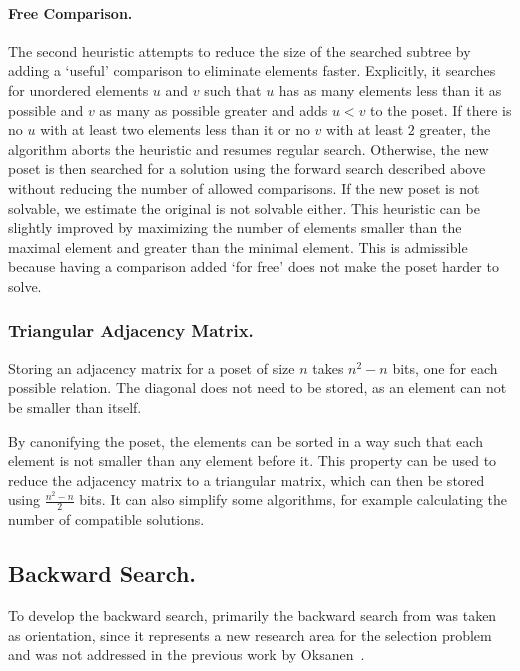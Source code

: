 \documentclass[twoside,leqno,twocolumn]{article}
\begin{document}
\paragraph{Free Comparison.}
The second heuristic attempts to reduce the size of the searched subtree by adding a `useful' comparison to eliminate elements faster.
Explicitly, it searches for unordered elements $u$ and $v$ such that $u$ has as many elements less than it as possible and $v$ as many as possible greater and adds $u < v$ to the poset.
If there is no $u$ with at least two elements less than it or no $v$ with at least $2$ greater, the algorithm aborts the heuristic and resumes regular search.
Otherwise, the new poset is then searched for a solution using the forward search described above without reducing the number of allowed comparisons.
If the new poset is not solvable, we estimate the original is not solvable either.
This heuristic can be slightly improved by maximizing the number of elements smaller than the maximal element and greater than the minimal element.
This is admissible because having a comparison added `for free' does not make the poset harder to solve.

\subsubsection{Triangular Adjacency Matrix.}
Storing an adjacency matrix for a poset of size $n$ takes $n^2 - n$ bits, one for each possible relation.
The diagonal does not need to be stored, as an element can not be smaller than itself.

By canonifying the poset, the elements can be sorted in a way such that each element is not smaller than any element before it.
This property can be used to reduce the adjacency matrix to a triangular matrix, which can then be stored using $\frac{n^2 - n}{2}$ bits.
It can also simplify some algorithms, for example calculating the number of compatible solutions.

\subsection{Backward Search.} \label{sec:backward}


To develop the backward search, primarily the backward search from \cite{stober2022lower} was taken as orientation, since it represents a new research area for the selection problem and was not addressed in the previous work by Oksanen~\cite{Oksanen}.
\end{document}
